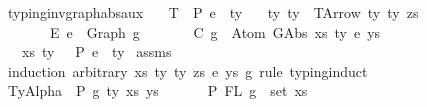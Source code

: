 \begin{isabellebody}
\isamarkupfalse%
%
\endisatagproof
{\isafoldproof}%
%
\isadelimproof
%
\endisadelimproof
%
\isadelimdocument
%
\endisadelimdocument
%
\isatagdocument
%
\isamarkuptrue%
%
\endisatagdocument
{\isafolddocument}%
%
\isadelimdocument
%
\endisadelimdocument
{}\isamarkupfalse%
\ typing{\isacharunderscore}{\kern0pt}inv{\isacharunderscore}{\kern0pt}graph{\isacharunderscore}{\kern0pt}abs{\isacharunderscore}{\kern0pt}aux{\isacharcolon}{\kern0pt}\isanewline
\ \ \ T{\isacharcolon}{\kern0pt}\ {\isachardoublequoteopen}{\isasymGamma}\ {\isasymturnstile}{\isacharbraceleft}{\kern0pt}P{\isacharbraceright}{\kern0pt}\ e{\isacharprime}{\kern0pt}\ {\isacharcolon}{\kern0pt}\ ty{\isachardoublequoteclose}\isanewline
\ \ \ ty{\isacharcolon}{\kern0pt}\ {\isachardoublequoteopen}ty\ {\isacharequal}{\kern0pt}\ TArrow\ ty{}\ ty{}\ zs{\isachardoublequoteclose}\isanewline
\ \ \ \ \ \ \ E{\isacharcolon}{\kern0pt}\ {\isachardoublequoteopen}e{\isacharprime}{\kern0pt}\ {\isacharequal}{\kern0pt}\ Graph\ g{\isacharprime}{\kern0pt}{\isachardoublequoteclose}\isanewline
\ \ \ \ \ \ \ C{\isacharcolon}{\kern0pt}\ {\isachardoublequoteopen}g{\isacharprime}{\kern0pt}\ {\isasymsimeq}\ Atom\ {\isacharparenleft}{\kern0pt}GAbs\ xs\ ty{}\ e{\isacharparenright}{\kern0pt}\ ys{\isachardoublequoteclose}\isanewline
\ \ \ {\isachardoublequoteopen}{\isacharparenleft}{\kern0pt}xs{\isacharcomma}{\kern0pt}\ ty{}{\isacharparenright}{\kern0pt}\ {\isacharhash}{\kern0pt}\ {\isasymGamma}\ {\isasymturnstile}{\isacharbraceleft}{\kern0pt}P{\isacharbraceright}{\kern0pt}\ e\ {\isacharcolon}{\kern0pt}\ ty{}{\isachardoublequoteclose}\isanewline
%
\isadelimproof
%
\endisadelimproof
%
\isatagproof
{}\isamarkupfalse%
\ assms\isanewline
{}\isamarkupfalse%
\ {\isacharparenleft}{\kern0pt}induction\ arbitrary{\isacharcolon}{\kern0pt}\ xs\ ty{}\ ty{}\ zs\ e\ ys\ g{\isacharprime}{\kern0pt}\ rule{\isacharcolon}{\kern0pt}\ typing{\isachardot}{\kern0pt}induct{\isacharparenright}{\kern0pt}\isanewline
\ \ \isamarkupfalse%
\ {\isacharparenleft}{\kern0pt}TyAlpha\ {\isasymGamma}{}{\isacharprime}{\kern0pt}\ P\ g\ ty{\isacharprime}{\kern0pt}\ xs{\isacharprime}{\kern0pt}\ ys{\isacharprime}{\kern0pt}{\isacharparenright}{\kern0pt}\isanewline
\ \ \isanewline
\ \ \isamarkupfalse%
\ P{}{\isacharcolon}{\kern0pt}\ {\isachardoublequoteopen}FL\ g\ {\isasymsubseteq}\ set\ xs{\isacharprime}{\kern0pt}{\isachardoublequoteclose}\isanewline

\end{isabellebody}
